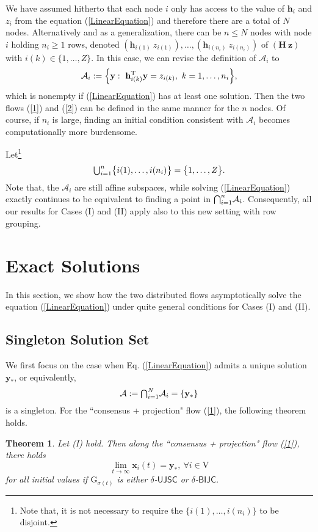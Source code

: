 \documentclass[a4paper, 11pt]{article}
\newcommand*\mcap{\mathbin{\mathpalette\mcapinn\relax}}
\newcommand*\mcapinn[2]{\vcenter{\hbox{$\mathsurround=0pt
  \ifx\displaystyle#1\textstyle\else#1\fi\bigcap$}}}
\newcommand*\mcup{\mathbin{\mathpalette\mcupinn\relax}}
\newcommand*\mcupinn[2]{\vcenter{\hbox{$\mathsurround=0pt
  \ifx\displaystyle#1\textstyle\else#1\fi\bigcup$}}}
\def\T{^{\rm\tiny T}}
\newtheorem{theorem}{Theorem}
\begin{document}
We have assumed hitherto that each node $i$ only has access to the value of $\mathbf{h}_i$ and ${z}_i$ from the equation (\ref{LinearEquation}) and therefore there are a total of $N$ nodes. Alternatively and as a generalization, there can be $n\leq N$ nodes with node $i$ holding $n_i\geq 1$ rows, denoted $(\mathbf{h}_{i(1)}\ {z}_{i(1)}),\dots,(\mathbf{h}_{i({n_i})}\ {z}_{i({n_i})})$ of $(\mathbf{H}\ \mathbf{z})$ with $i(k)\in \{1,\dots, Z\}$. In this case, we can revise the definition of $\mathcal{A}_i$ to
\begin{align*}
\mathcal{A}_i:=\Big\{\mathbf{y}:\ \mathbf{h}_{i(k)}\T \mathbf{y}=z_{i(k)},\ k=1,\dots,n_i \Big\},
\end{align*}
which is nonempty if (\ref{LinearEquation}) has at least one solution. Then the two flows (\ref{1}) and (\ref{2}) can be defined in the same manner for the $n$ nodes. Of course, if $n_i$ is large, finding an initial condition consistent with $\mathcal{A}_i$ becomes computationally more burdensome.

Let\footnote{Note that, it is not necessary to require the $\big\{ i(1), \dots, i({n_i})\big\}$ to be disjoint.} $$
\mcup_{i=1}^n \big\{ i(1), \dots, i({n_i})\big\}=\big\{ 1, \dots, Z\big\}.
$$
Note  that,  the $\mathcal{A}_i$ are still affine subspaces,  while solving (\ref{LinearEquation}) exactly  continues to be equivalent to finding a point in $\mcap_{i=1}^n \mathcal{A}_i$. Consequently, all our results for Cases (I) and (II) apply also to this new setting with row grouping.


\section{Exact Solutions}\label{Sec:exact}
In this section, we show how the two distributed flows  asymptotically  solve the equation (\ref{LinearEquation}) under quite general conditions for Cases (I) and (II).
\subsection{Singleton  Solution Set}
We first focus on the case when Eq. (\ref{LinearEquation}) admits a unique solution $\mathbf{y}_\ast$, or equivalently,  $$
\mathcal{A}:= \mcap_{i=1}^N\mathcal{A}_i=\{\mathbf{y}_\ast\}
$$ is a singleton. For the ``consensus + projection" flow (\ref{1}), the following theorem holds.



\begin{theorem}\label{thm1}
Let (I) hold. Then  along  the ``consensus + projection" flow (\ref{1}), there holds $$
\lim_{t\to \infty} \mathbf{x}_i(t)=\mathbf{y}_\ast,\ \forall i\in\mathrm{V}$$ for all initial values if $\mathrm{G}_{\sigma(t)}$ is either  $\delta$-$\mathsf{UJSC}$ or $\delta$-$\mathsf{BIJC}$.
\end{theorem}
\end{document}
